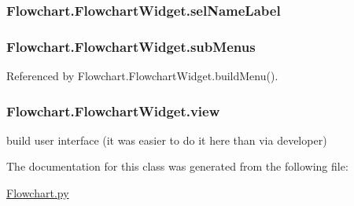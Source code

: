 \subsubsection[{sel\+Name\+Label}]{\setlength{\rightskip}{0pt plus 5cm}Flowchart.\+Flowchart\+Widget.\+sel\+Name\+Label}\label{classFlowchart_1_1FlowchartWidget_a3a9d580264503de8d51279bc0ab7fb28}
\hypertarget{classFlowchart_1_1FlowchartWidget_a8ea7900ef694e4fd187907589db25965}{}
\subsubsection[{sub\+Menus}]{\setlength{\rightskip}{0pt plus 5cm}Flowchart.\+Flowchart\+Widget.\+sub\+Menus}\label{classFlowchart_1_1FlowchartWidget_a8ea7900ef694e4fd187907589db25965}


Referenced by Flowchart.\+Flowchart\+Widget.\+build\+Menu().

\hypertarget{classFlowchart_1_1FlowchartWidget_a8ee88da9be1a80e14f5cd4445ee9817e}{}
\subsubsection[{view}]{\setlength{\rightskip}{0pt plus 5cm}Flowchart.\+Flowchart\+Widget.\+view}\label{classFlowchart_1_1FlowchartWidget_a8ee88da9be1a80e14f5cd4445ee9817e}


build user interface (it was easier to do it here than via developer) 



The documentation for this class was generated from the following file\+:\begin{DoxyCompactItemize}
\item 
\hyperlink{Flowchart_8py}{Flowchart.\+py}\end{DoxyCompactItemize}
